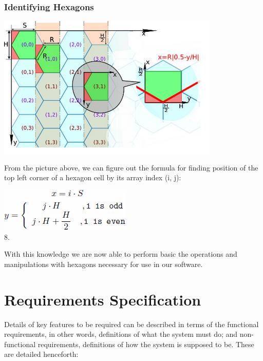 \documentclass[10pt,a4paper]{article}
\begin{document}
\subsubsection{Identifying Hexagons}
\begin{center}
\includegraphics[scale=0.5]{image10.png}\\
\end{center}
From the picture above, we can figure out the formula for finding position of the top left corner of a hexagon cell by its array index (i, j):\\
\begin{center}
\includegraphics[scale=0.5]{image16.png}\\8.
\end{center}
With this knowledge we are now able to perform basic the operations and manipulations with hexagons necessary for use in our software.

\section{Requirements Specification}
Details of key features to be required can be described in terms of the functional requirements, in other words, definitions of what the system must do; and non-functional requirements, definitions of how the system is supposed to be. These are detailed henceforth:
\end{document}
